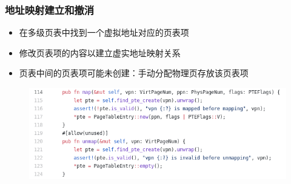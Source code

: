 \begin{frame}
    \frametitle{地址映射建立和撤消}
% 
% 
        \begin{itemize}
        \item 在多级页表中找到一个虚拟地址对应的页表项
        \item 修改页表项的内容以建立虚实地址映射关系
        \item 页表中间的页表项可能未创建：手动分配物理页存放该页表项
        \end{itemize}
% 
    \begin{figure}
        \centering
        \includegraphics[width=0.8\linewidth]{figs/page_table-114.png}
    \end{figure}
% 
% 
% 
% 
\end{frame}
